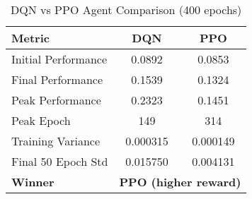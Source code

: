 \begin{table}[htbp]
\centering
\caption{DQN vs PPO Agent Comparison (400 epochs)}
\label{tab:rl_agent_comparison}
\small
\begin{tabular}{lcc}
\toprule
\textbf{Metric}  & \textbf{DQN}  & \textbf{PPO} \\
\midrule
Initial Performance & 0.0892 & 0.0853 \\
Final Performance & 0.1539 & 0.1324 \\
Peak Performance & 0.2323 & 0.1451 \\
Peak Epoch & 149 & 314 \\
Training Variance & 0.000315 & 0.000149 \\
Final 50 Epoch Std & 0.015750 & 0.004131 \\
\midrule
\textbf{Winner} & \multicolumn{2}{c}{\textbf{PPO (higher reward)}} \\
\bottomrule
\end{tabular}
\end{table}
